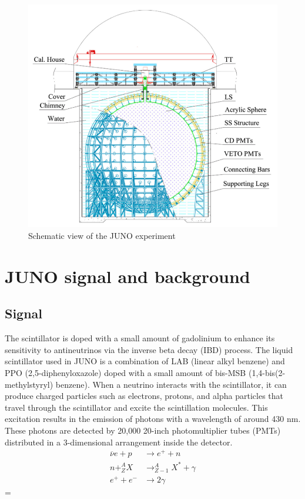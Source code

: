 \begin{figure}[h]
	\centering
	\includegraphics[width=0.7\linewidth]{Images/juno_scheme_experiment}
	\caption[JUNO scheme experiment]{Schematic view of the JUNO experiment}
	\label{fig:junoschemeexperiment}
\end{figure}


\section{JUNO signal and background}
\subsection{Signal}
The scintillator is doped with a small amount of gadolinium to enhance its sensitivity to antineutrinos via the inverse beta decay (IBD) process. The liquid scintillator used in JUNO is a combination of LAB (linear alkyl benzene) and PPO (2,5-diphenyloxazole) doped with a small amount of bis-MSB (1,4-bis(2-methylstyryl) benzene). When a neutrino interacts with the scintillator, it can produce charged particles such as electrons, protons, and alpha particles that travel through the scintillator and excite the scintillation molecules. This excitation results in the emission of photons with a wavelength of around 430 nm. These photons are detected by 20,000 20-inch photomultiplier tubes (PMTs) distributed in a 3-dimensional arrangement inside the detector.\\




\begin{equation}
	\begin{aligned}
		\overline{\nu}e + p &\rightarrow e^+ + n \\
		n + ^A_ZX &\rightarrow ^{A}_{Z-1}X^* + \gamma \\
		e^+ + e^- &\rightarrow 2\gamma
	\end{aligned}
\end{equation} =

